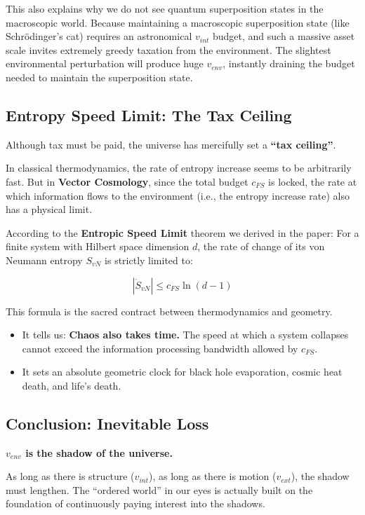 This also explains why we do not see quantum superposition states in the macroscopic world. Because maintaining a macroscopic superposition state (like Schrödinger's cat) requires an astronomical $v_{int}$ budget, and such a massive asset scale invites extremely greedy taxation from the environment. The slightest environmental perturbation will produce huge $v_{env}$, instantly draining the budget needed to maintain the superposition state.

\subsection{Entropy Speed Limit: The Tax Ceiling}

Although tax must be paid, the universe has mercifully set a \textbf{``tax ceiling''}.

In classical thermodynamics, the rate of entropy increase seems to be arbitrarily fast. But in \textbf{Vector Cosmology}, since the total budget $c_{FS}$ is locked, the rate at which information flows to the environment (i.e., the entropy increase rate) also has a physical limit.

According to the \textbf{Entropic Speed Limit} theorem we derived in the paper: For a finite system with Hilbert space dimension $d$, the rate of change of its von Neumann entropy $S_{vN}$ is strictly limited to:

\[|\dot{S}_{vN}| \le c_{FS} \ln(d-1)\]

This formula is the sacred contract between thermodynamics and geometry.

\begin{itemize}
\item It tells us: \textbf{Chaos also takes time.} The speed at which a system collapses cannot exceed the information processing bandwidth allowed by $c_{FS}$.

\item It sets an absolute geometric clock for black hole evaporation, cosmic heat death, and life's death.
\end{itemize}

\subsection{Conclusion: Inevitable Loss}

\textbf{$v_{env}$ is the shadow of the universe.}

As long as there is structure ($v_{int}$), as long as there is motion ($v_{ext}$), the shadow must lengthen. The ``ordered world'' in our eyes is actually built on the foundation of continuously paying interest into the shadows.

